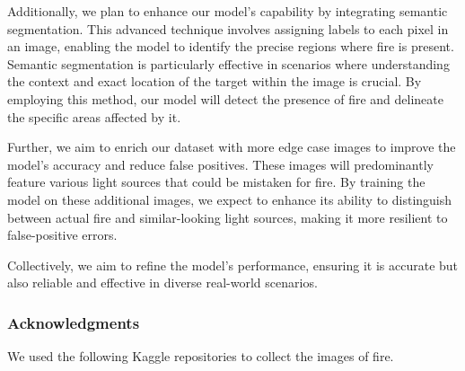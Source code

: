 Additionally, we plan to enhance our model's capability by integrating semantic segmentation. This advanced technique involves assigning labels to each pixel in an image, enabling the model to identify the precise regions where fire is present. Semantic segmentation is particularly effective in scenarios where understanding the context and exact location of the target within the image is crucial. By employing this method, our model will detect the presence of fire and delineate the specific areas affected by it.

Further, we aim to enrich our dataset with more edge case images to improve the model's accuracy and reduce false positives. These images will predominantly feature various light sources that could be mistaken for fire. By training the model on these additional images, we expect to enhance its ability to distinguish between actual fire and similar-looking light sources, making it more resilient to false-positive errors.

Collectively, we aim to refine the model's performance, ensuring it is accurate but also reliable and effective in diverse real-world scenarios.





\subsubsection*{Acknowledgments}

We used the following Kaggle repositories to collect the images of fire.

